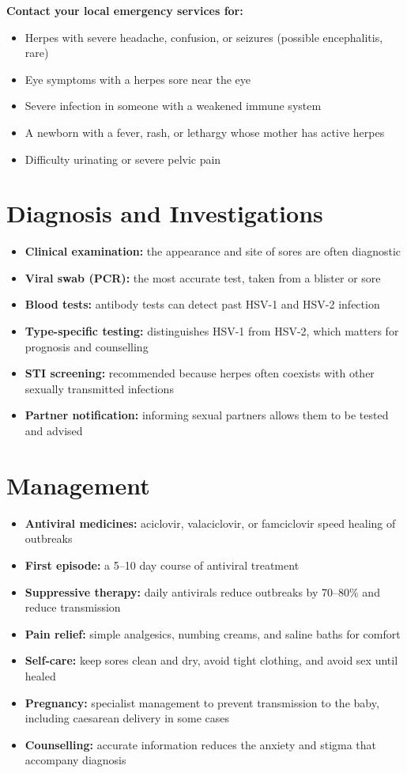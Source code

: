 \textbf{Contact your local emergency services for:}
\begin{itemize}
    \item Herpes with severe headache, confusion, or seizures (possible encephalitis, rare)
    \item Eye symptoms with a herpes sore near the eye
    \item Severe infection in someone with a weakened immune system
    \item A newborn with a fever, rash, or lethargy whose mother has active herpes
    \item Difficulty urinating or severe pelvic pain
\end{itemize}

\section*{Diagnosis and Investigations}
\begin{itemize}
    \item \textbf{Clinical examination:} the appearance and site of sores are often diagnostic
    \item \textbf{Viral swab (PCR):} the most accurate test, taken from a blister or sore
    \item \textbf{Blood tests:} antibody tests can detect past HSV-1 and HSV-2 infection
    \item \textbf{Type-specific testing:} distinguishes HSV-1 from HSV-2, which matters for prognosis and counselling
    \item \textbf{STI screening:} recommended because herpes often coexists with other sexually transmitted infections
    \item \textbf{Partner notification:} informing sexual partners allows them to be tested and advised
\end{itemize}

\section*{Management}
\begin{itemize}
    \item \textbf{Antiviral medicines:} aciclovir, valaciclovir, or famciclovir speed healing of outbreaks
    \item \textbf{First episode:} a 5--10 day course of antiviral treatment
    \item \textbf{Suppressive therapy:} daily antivirals reduce outbreaks by 70--80\% and reduce transmission
    \item \textbf{Pain relief:} simple analgesics, numbing creams, and saline baths for comfort
    \item \textbf{Self-care:} keep sores clean and dry, avoid tight clothing, and avoid sex until healed
    \item \textbf{Pregnancy:} specialist management to prevent transmission to the baby, including caesarean delivery in some cases
    \item \textbf{Counselling:} accurate information reduces the anxiety and stigma that accompany diagnosis
\end{itemize}

